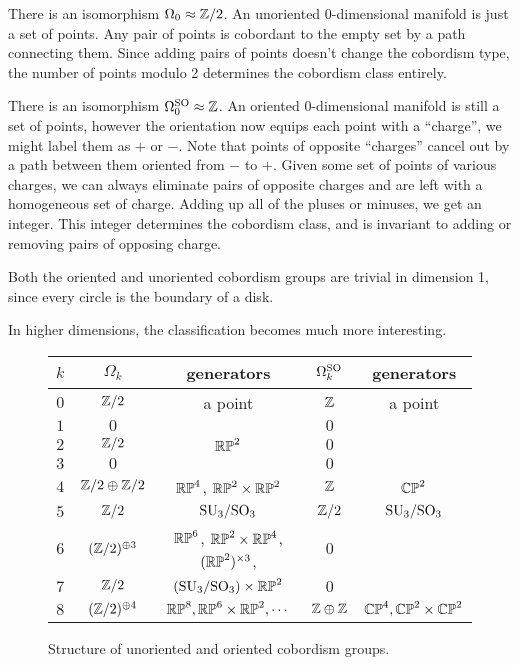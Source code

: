 \begin{example}
	There is an isomorphism $\Omega_0\approx \mathbb{Z}/2$. An unoriented 0-dimensional manifold is just a set of points. Any pair of points is cobordant to the empty set by a path connecting them. Since adding pairs of points doesn't change the cobordism type, the number of points modulo 2 determines the cobordism class entirely.
\end{example}

\begin{example}
	There is an isomorphism $\Omega_0^{\operatorname{SO}} \approx \mathbb{Z}$. An oriented 0-dimensional manifold is still a set of points, however the orientation now equips each point with a ``charge'', we might label them as $+$ or $-$. Note that points of opposite ``charges'' cancel out by a path between them oriented from $-$ to $+$. Given some set of points of various charges, we can always eliminate pairs of opposite charges and are left with a homogeneous set of charge. Adding up all of the pluses or minuses, we get an integer. This integer determines the cobordism class, and is invariant to adding or removing pairs of opposing charge.
\end{example}

\begin{example}
	Both the oriented and unoriented cobordism groups are trivial in dimension 1, since every circle is the boundary of a disk.
\end{example}

In higher dimensions, the classification becomes much more interesting. 

\begin{figure}[ht]
	\renewcommand{\arraystretch}{1.2}
	\centering
	\begin{tabular}{r||c|c||c|c}
		$k$ & $\Omega_k$ & generators & $\Omega_k^{\operatorname{SO}}$ & generators \\
		\hline
		$0$ & $\mathbb{Z}/2$ & a point & $\mathbb{Z}$ & a point\\
		$1$ & $0$ & & $0$ & \\
		$2$ & $\mathbb{Z}/2$ & $\mathbb{RP}^2$ & $0$ & \\
		$3$ & $0$ & & $0$ & \\
		$4$ & $\mathbb{Z}/2\oplus \mathbb{Z}/2$ & $\mathbb{RP}^4$, $\mathbb{RP}^2\times \mathbb{RP}^2$ & $\mathbb{Z}$ & $\mathbb{CP}^2$ \\
		$5$ & $\mathbb{Z}/2$ & ${\operatorname{SU}}_3/{\operatorname{SO}}_3$ & $\mathbb{Z}/2$ & ${\operatorname{SU}}_3/{\operatorname{SO}}_3$\\
		$6$ & $(\mathbb{Z}/2)^{\oplus 3}$ & $\mathbb{RP}^6$, $\mathbb{RP}^2\times \mathbb{RP}^4$, $(\mathbb{RP}^2)^{\times 3}$, & $0$ & \\ 
		$7$ & $\mathbb{Z}/2$ & $({\operatorname{SU}}_3/{\operatorname{SO}}_3) \times \mathbb{RP}^2$ & $0$ & \\ 
		$8$ & $(\mathbb{Z}/2)^{\oplus 4}$ & $\mathbb{RP}^8, \mathbb{RP}^6\times \mathbb{RP}^2, \cdots$ & $\mathbb{Z}\oplus \mathbb{Z}$ & $\mathbb{CP}^4, \mathbb{CP}^2\times \mathbb{CP}^2$\\
	\end{tabular}
	\medskip
	\caption{Structure of unoriented and oriented cobordism groups.}\label{fig:cobordism-structure-table}
\end{figure}

